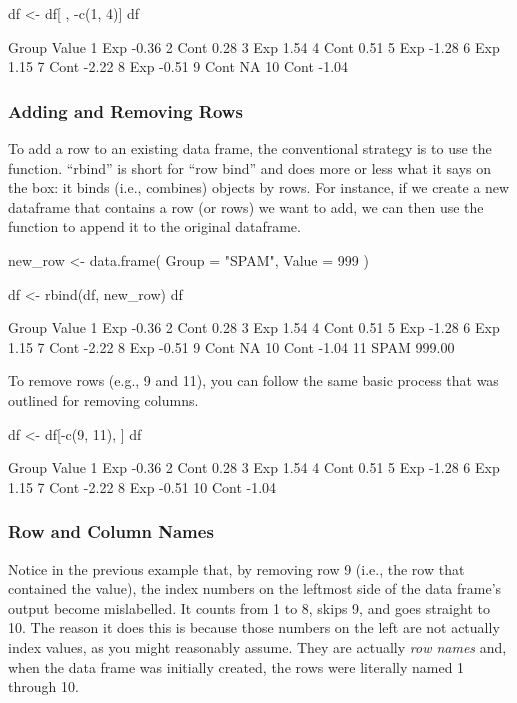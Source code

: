 \begin{inR}
df <- df[ , -c(1, 4)]
df
\end{inR}
\begin{outR}
   Group Value
1    Exp -0.36
2   Cont  0.28
3    Exp  1.54
4   Cont  0.51
5    Exp -1.28
6    Exp  1.15
7   Cont -2.22
8    Exp -0.51
9   Cont    NA
10  Cont -1.04
\end{outR}

\subsubsection{Adding and Removing Rows}

To add a row to an existing data frame, the conventional strategy is to use the  function. ``rbind'' is short for ``row bind'' and does more or less what it says on the box: it binds (i.e., combines) objects by rows. For instance, if we create a new dataframe that contains a row (or rows) we want to add, we can then use the  function to append it to the original dataframe.

\begin{inR}
new_row <- data.frame(
  Group = "SPAM",
  Value = 999
)
                      
df <- rbind(df, new_row)
df
\end{inR}
\begin{outR}
   Group  Value
1    Exp  -0.36
2   Cont   0.28
3    Exp   1.54
4   Cont   0.51
5    Exp  -1.28
6    Exp   1.15
7   Cont  -2.22
8    Exp  -0.51
9   Cont     NA
10  Cont  -1.04
11  SPAM 999.00
\end{outR}

To remove rows (e.g., 9 and 11), you can follow the same basic process that was outlined for removing columns.

\begin{inR}
df <- df[-c(9, 11), ]
df
\end{inR}
\begin{outR}
   Group Value
1    Exp -0.36
2   Cont  0.28
3    Exp  1.54
4   Cont  0.51
5    Exp -1.28
6    Exp  1.15
7   Cont -2.22
8    Exp -0.51
10  Cont -1.04
\end{outR}

\subsubsection{Row and Column Names}

Notice in the previous example that, by removing row 9 (i.e., the row that contained the  value), the index numbers on the leftmost side of the data frame's output become mislabelled. It counts from 1 to 8, skips 9, and goes straight to 10. The reason it does this is because those numbers on the left are not actually index values, as you might reasonably assume. They are actually \textit{row names} and, when the data frame was initially created, the rows were literally named 1 through 10.  

